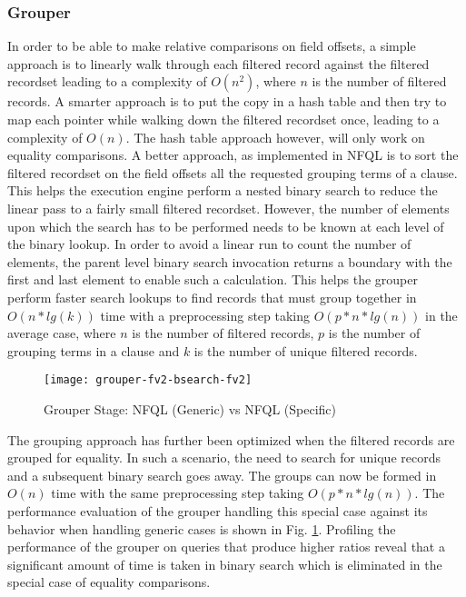\subsubsection{Grouper}

In order to be able to make relative comparisons on field offsets, a simple
approach is to linearly walk through each filtered record against the filtered
recordset leading to a complexity of $O(n^2)$, where $n$ is the number of
filtered records. A smarter approach is to put the copy in a hash table and
then try to map each pointer while walking down the filtered recordset once,
leading to a complexity of $O(n)$. The hash table approach however, will only
work on equality comparisons. A better approach, as implemented in \ac{NFQL}
is to sort the filtered recordset on the field offsets all the requested
grouping terms of a clause. This helps the execution engine perform a nested
binary search to reduce the linear pass to a fairly small filtered recordset.
However, the number of elements upon which the search has to be performed
needs to be known at each level of the binary lookup. In order to avoid a
linear run to count the number of elements, the parent level binary search
invocation returns a boundary with the first and last element to enable such a
calculation. This helps the grouper perform faster search lookups to find
records that must group together in $O(n*lg(k))$ time with a preprocessing
step taking $O(p*n*lg(n))$ in the average case, where $n$ is the number of
filtered records, $p$ is the number of grouping terms in a clause and $k$ is
the number of unique filtered records.

\begin{figure}[ht!]
  \begin{center}
    \texttt{[image: grouper-fv2-bsearch-fv2]}
    \caption{Grouper Stage: NFQL (Generic) vs NFQL (Specific)}
    \label{fig:fv1-fv2-grouper}
  \end{center}
\end{figure}

The grouping approach has further been optimized when the filtered records are
grouped for equality. In such a scenario, the need to search for unique
records and a  subsequent binary search goes away.  The groups can now be
formed in $O(n)$ time with the same preprocessing step taking $O(p*n*lg(n))$.
The performance evaluation of the grouper handling this special case against
its behavior when handling generic cases is shown in Fig.
\ref{fig:fv1-fv2-grouper}. Profiling the performance of the grouper on queries
that produce higher ratios reveal that a significant amount of time is taken
in binary search which is eliminated in the special case of equality
comparisons.

